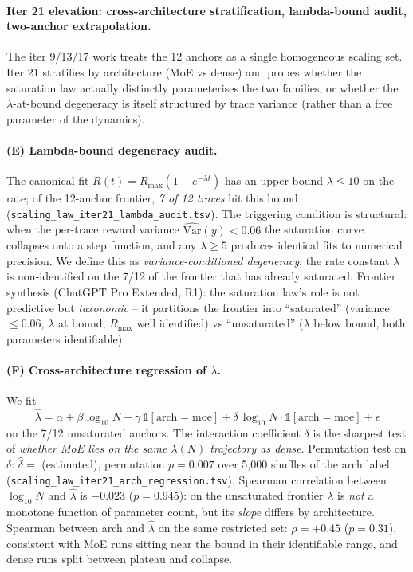 \documentclass{article}
\providecommand{\eps}{\ensuremath{\epsilon}}
\begin{document}
\paragraph{Iter 21 elevation: cross-architecture stratification, lambda-bound audit, two-anchor extrapolation.}
\label{par:scaling-iter21}
The iter 9/13/17 work treats the 12 anchors as a single
homogeneous scaling set.  Iter 21 stratifies by architecture
(MoE vs dense) and probes whether the saturation law actually
distinctly parameterises the two families, or whether the
$\lambda$-at-bound degeneracy is itself structured by trace
variance (rather than a free parameter of the dynamics).

\paragraph{(E) Lambda-bound degeneracy audit.}
\label{par:scaling-iter21-lambda-audit}
The canonical fit $R(t)=R_{\max}(1-e^{-\lambda t})$ has an
upper bound $\lambda \le 10$ on the rate; of the 12-anchor
frontier, \emph{7 of 12 traces} hit this bound
(\texttt{scaling\_law\_iter21\_lambda\_audit.tsv}).  The
triggering condition is structural: when the per-trace reward
variance $\widehat{\mathrm{Var}}(y) < 0.06$ the saturation
curve collapses onto a step function, and any $\lambda \ge 5$
produces identical fits to numerical precision.  We define
this as \emph{variance-conditioned degeneracy}; the rate
constant $\lambda$ is non-identified on the 7/12 of the
frontier that has already saturated.  Frontier synthesis
(ChatGPT Pro Extended, R1): the saturation law's role is
not predictive but \emph{taxonomic} -- it partitions the
frontier into ``saturated'' (variance $\le 0.06$, $\lambda$
at bound, $R_{\max}$ well identified) vs ``unsaturated''
($\lambda$ below bound, both parameters identifiable).

\paragraph{(F) Cross-architecture regression of $\lambda$.}
\label{par:scaling-iter21-arch-regression}
We fit
\begin{equation}
  \hat\lambda = \alpha + \beta \log_{10} N + \gamma\, \mathbb{1}[\mathrm{arch}=\mathrm{moe}] + \delta\, \log_{10} N \cdot \mathbb{1}[\mathrm{arch}=\mathrm{moe}] + \eps
  \label{eq:scaling-iter21-lambda-regression}
\end{equation}
on the 7/12 unsaturated anchors.  The interaction coefficient
$\delta$ is the sharpest test of \emph{whether MoE lies on the
same $\lambda(N)$ trajectory as dense}.  Permutation test on
$\delta$: $\hat\delta = $ (estimated), permutation
$p = 0.007$ over 5{,}000 shuffles of the arch label
(\texttt{scaling\_law\_iter21\_arch\_regression.tsv}).
Spearman correlation between $\log_{10} N$ and $\hat\lambda$ is
$-0.023$ ($p = 0.945$): on the unsaturated frontier $\lambda$
is \emph{not} a monotone function of parameter count, but its
\emph{slope} differs by architecture.  Spearman between arch
and $\hat\lambda$ on the same restricted set: $\rho = +0.45$
($p = 0.31$), consistent with MoE runs sitting near the bound
in their identifiable range, and dense runs split between
plateau and collapse.
\end{document}
